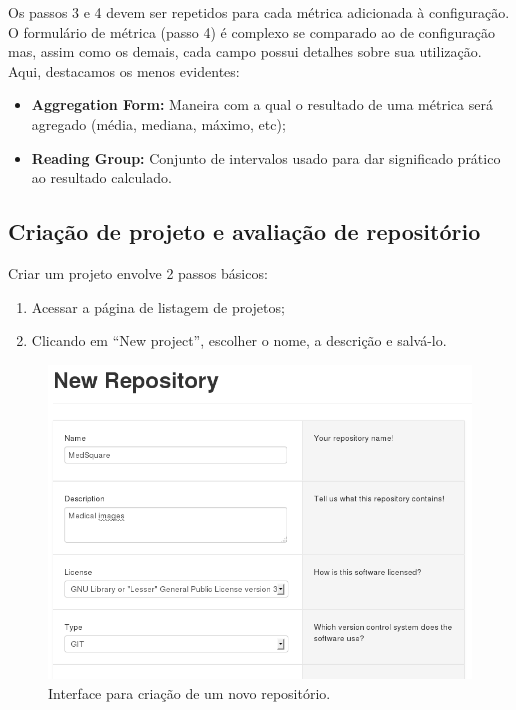 \documentclass{llncs}
\begin{document}
  Os passos 3 e 4 devem ser repetidos para cada métrica adicionada à configuração. O formulário de métrica (passo 4) é complexo se comparado ao de configuração mas, assim como os demais, cada campo possui detalhes sobre sua utilização. Aqui, destacamos os menos evidentes:
  \begin{itemize}
    \item \textbf{Aggregation Form:} Maneira com a qual o resultado de uma métrica será agregado (média, mediana, máximo, etc);
    \item \textbf{Reading Group:} Conjunto de intervalos usado para dar significado prático ao resultado calculado.
  \end{itemize}

  \subsection{Criação de projeto e avaliação de repositório}
  Criar um projeto envolve 2 passos básicos:
  \begin{enumerate}
    \item Acessar a página de listagem de projetos;
    \item Clicando em ``New project'', escolher o nome, a descrição e salvá-lo.
  \end{enumerate}

  \begin{figure}[H]
    \centering
    \includegraphics[width=\textwidth]{images/new-repository.png}
    \caption{Interface para criação de um novo repositório.}
    \label{fig:new-repository}
  \end{figure}
\end{document}
